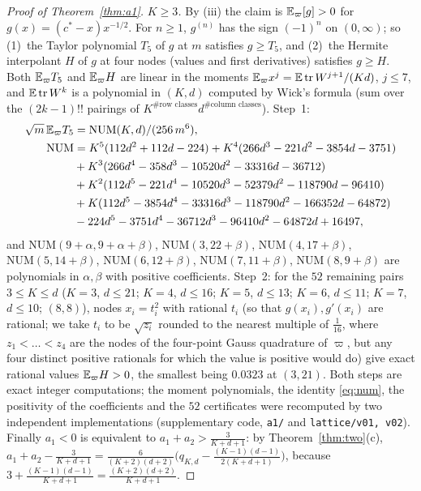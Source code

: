 \begin{proof}[Proof of Theorem~\ref{thm:a1}]
\emph{$K\ge3$.} By (iii) the claim is $\mathbb{E}_\varpi[g]>0$ for $g(x)=(c^\ast-x)x^{-1/2}$. For $n\ge1$, $g^{(n)}$ has the sign
$(-1)^n$ on $(0,\infty)$; so (1)~the Taylor polynomial $T_5$ of $g$ at $m$ satisfies $g\ge T_5$, and (2)~the Hermite
interpolant $H$ of $g$ at four nodes (values and first derivatives) satisfies $g\ge H$. Both $\mathbb{E}_\varpi T_5$ and $\mathbb{E}_\varpi H$
are linear in the moments $\mathbb{E}_\varpi x^j=\mathbb{E}\operatorname{tr} W^{j+1}/(Kd)$, $j\le7$, and $\mathbb{E}\operatorname{tr} W^k$ is a polynomial in $(K,d)$ computed by
Wick's formula (sum over the $(2k-1)!!$ pairings of $K^{\#\text{row classes}}d^{\#\text{column classes}}$). Step~1:
\begin{equation}\label{eq:num}
\begin{aligned}
\sqrt m\,\mathbb{E}_\varpi T_5&=\mathrm{NUM}(K,d)/(256\,m^6),\\
\mathrm{NUM}&=K^5(112d^2+112d-224)+K^4(266d^3-221d^2-3854d-3751)\\
&+K^3(266d^4-358d^3-10520d^2-33316d-36712)\\
&+K^2(112d^5-221d^4-10520d^3-52379d^2-118790d-96410)\\
&+K(112d^5-3854d^4-33316d^3-118790d^2-166352d-64872)\\
&-224d^5-3751d^4-36712d^3-96410d^2-64872d+16497,
\end{aligned}
\end{equation}
and $\mathrm{NUM}(9+\alpha,9+\alpha+\beta)$, $\mathrm{NUM}(3,22+\beta)$, $\mathrm{NUM}(4,17+\beta)$, $\mathrm{NUM}(5,14+\beta)$,
$\mathrm{NUM}(6,12+\beta)$, $\mathrm{NUM}(7,11+\beta)$, $\mathrm{NUM}(8,9+\beta)$ are polynomials in $\alpha,\beta$ with
positive coefficients. Step~2: for the $52$ remaining pairs $3\le K\le d$ ($K=3$, $d\le21$; $K=4$, $d\le16$; $K=5$,
$d\le13$; $K=6$, $d\le11$; $K=7$, $d\le10$; $(8,8)$), nodes $x_i=t_i^2$ with rational $t_i$ (so that $g(x_i),g'(x_i)$
are rational; we take $t_i$ to be $\sqrt{z_i}$ rounded to the nearest multiple of $\frac1{16}$, where $z_1<\dots<z_4$ are the
nodes of the four-point Gauss quadrature of $\varpi$, but any four distinct positive rationals for which the value is
positive would do) give exact rational values $\mathbb{E}_\varpi H>0$, the smallest being $0.0323$ at $(3,21)$. Both steps are exact
integer computations; the moment polynomials, the identity \eqref{eq:num}, the positivity of the coefficients and the
$52$ certificates were recomputed by two independent implementations (supplementary code, \texttt{a1/} and \texttt{lattice/v01, v02}).
Finally $a_1<0$ is equivalent to $a_1+a_2>\frac3{K+d+1}$: by Theorem~\ref{thm:two}(c),
$a_1+a_2-\frac3{K+d+1}=\frac{6}{(K+2)(d+2)}\big(q_{K,d}-\frac{(K-1)(d-1)}{2(K+d+1)}\big)$, because
$3+\frac{(K-1)(d-1)}{K+d+1}=\frac{(K+2)(d+2)}{K+d+1}$.
\end{proof}
